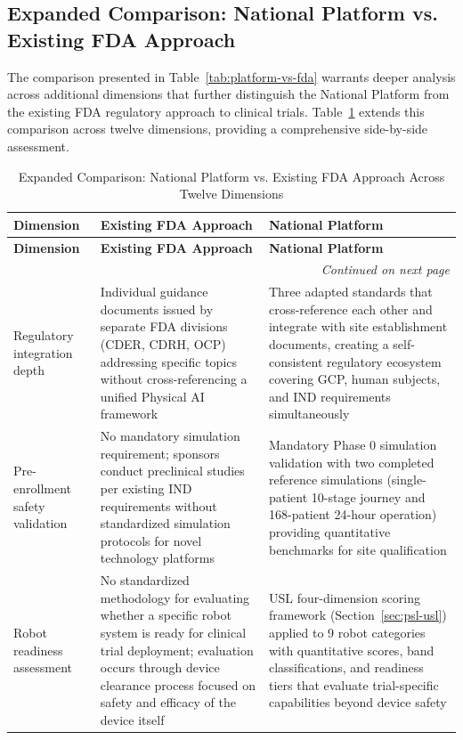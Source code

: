 \subsection{Expanded Comparison: National Platform vs. Existing FDA Approach}
\label{subsec:discuss-expanded-comparison}

The comparison presented in Table~\ref{tab:platform-vs-fda} warrants deeper
analysis across additional dimensions that further distinguish the National
Platform from the existing FDA regulatory approach to clinical trials.
Table~\ref{tab:expanded-platform-vs-fda} extends this comparison across
twelve dimensions, providing a comprehensive side-by-side assessment.

\begin{longtable}{p{2.5cm} p{4.5cm} p{5.5cm}}
\caption{Expanded Comparison: National Platform vs. Existing FDA Approach Across Twelve Dimensions}
\label{tab:expanded-platform-vs-fda} \\
\toprule
\textbf{Dimension} & \textbf{Existing FDA Approach} & \textbf{National Platform} \\
\midrule
\endfirsthead
\toprule
\textbf{Dimension} & \textbf{Existing FDA Approach} & \textbf{National Platform} \\
\midrule
\endhead
\midrule
\multicolumn{3}{r}{\textit{Continued on next page}} \\
\bottomrule
\endfoot
\bottomrule
\endlastfoot
Regulatory integration depth & Individual guidance documents issued by separate FDA divisions (CDER, CDRH, OCP) addressing specific topics without cross-referencing a unified Physical AI framework & Three adapted standards that cross-reference each other and integrate with site establishment documents, creating a self-consistent regulatory ecosystem covering GCP, human subjects, and IND requirements simultaneously \\
\midrule
Pre-enrollment safety validation & No mandatory simulation requirement; sponsors conduct preclinical studies per existing IND requirements without standardized simulation protocols for novel technology platforms & Mandatory Phase 0 simulation validation with two completed reference simulations (single-patient 10-stage journey and 168-patient 24-hour operation) providing quantitative benchmarks for site qualification \\
\midrule
Robot readiness assessment & No standardized methodology for evaluating whether a specific robot system is ready for clinical trial deployment; evaluation occurs through device clearance process focused on safety and efficacy of the device itself & USL four-dimension scoring framework (Section~\ref{sec:psl-usl}) applied to 9 robot categories with quantitative scores, band classifications, and readiness tiers that evaluate trial-specific capabilities beyond device safety \\

\end{longtable}
